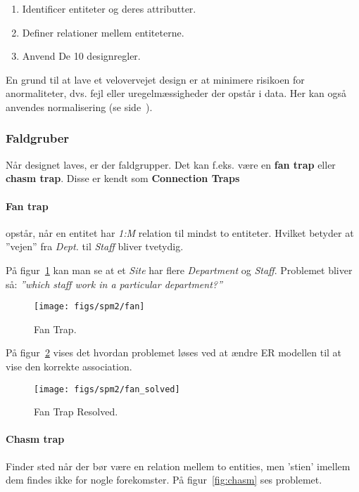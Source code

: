 \begin{enumerate}
	\item Identificer entiteter og deres attributter.
	\item Definer relationer mellem entiteterne.
	\item Anvend De 10 designregler.
\end{enumerate}

En grund til at lave et velovervejet design er at minimere risikoen for anormaliteter, dvs. fejl eller uregelmæssigheder der opstår i data. Her kan også anvendes normalisering (se side~\pageref{sec:normal}).

\subsubsection{Faldgruber}
Når designet laves, er der faldgrupper. Det kan f.eks. være en \textbf{fan trap} eller \textbf{chasm trap}. Disse er kendt som \textbf{Connection Traps} 

\paragraph{Fan trap} opstår, når en entitet har \textit{1:M} relation til mindst to entiteter. Hvilket betyder at ''vejen'' fra \textit{Dept.} til \textit{Staff} bliver tvetydig. 

På figur~\ref{fig:fan} kan man se at et \textit{Site} har flere \textit{Department} og \textit{Staff}. Problemet bliver så: \textit{''which staff work in a particular department?''}

\begin{figure}[h]
\centering
\texttt{[image: figs/spm2/fan]}
\caption{Fan Trap.}
\label{fig:fan}
\end{figure}

På figur~\ref{fig:fan_solved} vises det hvordan problemet løses ved at ændre ER modellen til at vise den korrekte association.

\begin{figure}[h]
\centering
\texttt{[image: figs/spm2/fan\_solved]}
\caption{Fan Trap Resolved.}
\label{fig:fan_solved}
\end{figure}

\paragraph{Chasm trap} 

Finder sted når der bør være en relation mellem to entities, men 'stien' imellem dem findes ikke for nogle forekomster. På figur~\ref{fig:chasm} ses problemet.

